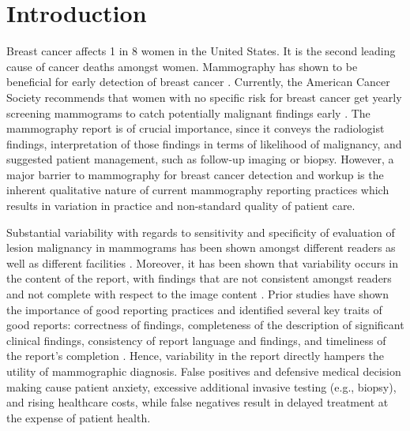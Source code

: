 \chapter{Introduction}
Breast cancer affects 1 in 8 women in the United States. It is the second leading cause of cancer deaths amongst women. Mammography has shown to be beneficial for early detection of breast cancer \cite{Nystrom:2002hb}. Currently, the American Cancer Society recommends that women with no specific risk for breast cancer get yearly screening mammograms to catch potentially malignant findings early \cite{Smith:2003en}. The mammography report is of crucial importance, since it conveys the radiologist findings, interpretation of those findings in terms of likelihood of malignancy, and suggested patient management, such as follow-up imaging or biopsy. However, a major barrier to mammography for breast cancer detection and workup is the inherent qualitative nature of current mammography reporting practices which results in variation in practice and non-standard quality of patient care.

Substantial variability with regards to sensitivity and specificity of evaluation of lesion malignancy in mammograms has been shown amongst different readers as well as different facilities \cite{Jackson:2009fw, Beam:1996ui, Elmore:2002vc, Taplin:2008bv}. Moreover, it has been shown that variability occurs in the content of the report, with findings that are not consistent amongst readers and not complete with respect to the image content \cite{Hobby:2000th, Robinson:1997uq}. Prior studies have shown the importance of good reporting practices and identified several key traits of good reports: correctness of findings, completeness of the description of significant clinical findings, consistency of report language and findings, and timeliness of the report’s completion \cite{Johnson:2004kh, HaraldO:2004hi}. Hence, variability in the report directly hampers the utility of mammographic diagnosis. False positives and defensive medical decision making cause patient anxiety, excessive additional invasive testing (e.g., biopsy), and rising healthcare costs, while false negatives result in delayed treatment at the expense of patient health.


